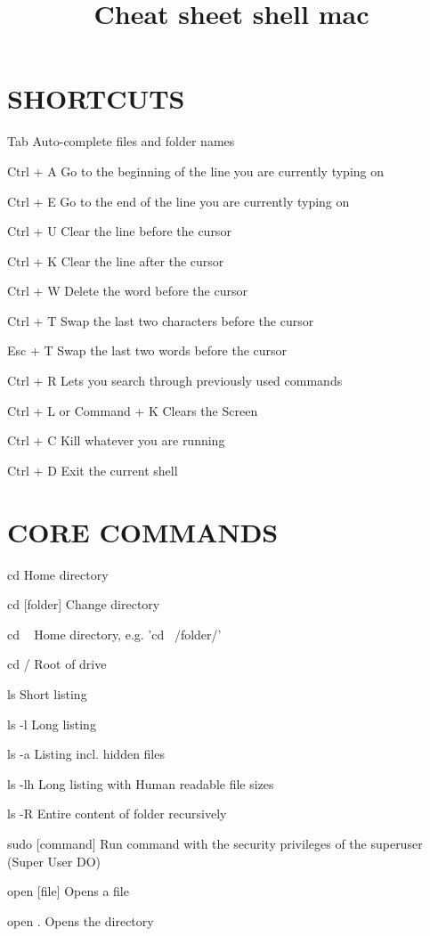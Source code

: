 \documentclass{article}
\title{Cheat sheet shell mac}
\author{}
\date{}
\begin{document}
\maketitle
\section*{SHORTCUTS}

 Tab  Auto-complete files and folder names 

 Ctrl + A  Go to the beginning of the line you are currently typing on 

 Ctrl + E  Go to the end of the line you are currently typing on 

 Ctrl + U  Clear the line before the cursor 

 Ctrl + K  Clear the line after the cursor 

 Ctrl + W  Delete the word before the cursor 

 Ctrl + T  Swap the last two characters before the cursor 

 Esc + T  Swap the last two words before the cursor 

 Ctrl + R  Lets you search through previously used commands 

 Ctrl + L or Command + K  Clears the Screen 

 Ctrl + C  Kill whatever you are running 

 Ctrl + D  Exit the current shell 

\section*{CORE COMMANDS}

 cd  Home directory 

 cd [folder]  Change directory 

 cd ~  Home directory, e.g. 'cd ~/folder/' 

 cd /  Root of drive 

 ls  Short listing 

 ls -l  Long listing 

 ls -a  Listing incl. hidden files 

 ls -lh  Long listing with Human readable file sizes 

 ls -R  Entire content of folder recursively 

 sudo [command]  Run command with the security privileges of the superuser (Super User DO) 

 open [file]  Opens a file 

 open .  Opens the directory 
\end{document}
